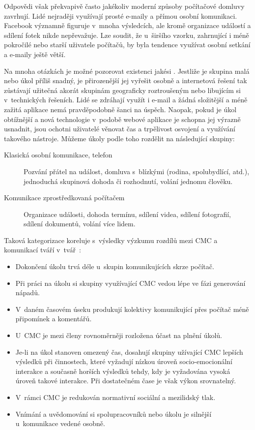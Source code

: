 \documentclass[12pt,oneside,final]{fithesis2}
\begin{document}
Odpovědi však překvapivě často jakékoliv moderní způsoby počítačové domluvy zavrhují. Lidé nejraději využívají prosté e-maily a přímou osobní komunikaci. Facebook významně figuruje v~mnoha výsledcích, ale kromě organizace událostí a sdílení fotek nikde nepřevažuje. Lze soudit, že u~širšího vzorku, zahrnující i méně pokročilé nebo starší uživatele počítačů, by byla tendence využívat osobní setkání a e-maily ještě větší.

Na mnoha otázkách je možné pozorovat existenci jakési . Jestliže je skupina malá nebo úkol příliš snadný, je přirozenější jej vyřešit osobně a internetová řešení tak zůstávají užitečná akorát skupinám geograficky roztroušeným nebo libujícím si v~technických řešeních. Lidé se zdráhají využít i e-mail a žádná složitější a méně zažitá aplikace nemá pravděpodobně šanci na úspěch. Naopak, pokud je úkol obtížnější a nová technologie v~podobě webové aplikace je schopna jej výrazně usnadnit, jsou ochotni uživatelé věnovat čas a trpělivost osvojení a využívání takového nástroje. Můžeme úkoly podle toho rozdělit na následující skupiny:

\begin{description}
    \item[Klasická osobní komunikace, telefon] Pozvání přátel na udá\-lost, do\-mlu\-va s~blíz\-ký\-mi (rodina, spolubydlící, atd.), jednoduchá skupinová dohoda či rozhodnutí, volání jednomu člověku.
    \item[Komunikace zprostředkovaná počítačem] Organizace události, dohoda termínu, sdílení videa, sdílení fotografií, sdílení dokumentů, volání více lidem.
\end{description}

Taková kategorizace koreluje s~výsledky výzkumu rozdílů mezi CMC a komunikací tváří v~tvář~\cite{bordia1997face}:

\begin{itemize}
    \item Dokončení úkolu trvá déle u~skupin komunikujících skrze počítač.
    \item Při práci na úkolu si skupiny využívající CMC vedou lépe ve fázi generování nápadů.
    \item V~daném časovém úseku produkují kolektivy komunikující přes po\-čí\-tač mé\-ně při\-po\-mí\-nek a ko\-men\-tá\-řů.
    \item U~CMC je mezi členy rovnoměrněji rozložena účast na plnění úkolů.
    \item Je-li na úkol stanoven omezený čas, dosahují skupiny užívající CMC lepších výsledků při činnostech, které vyžadují nízkou úroveň socio-emocionální interakce a současně horších výsledků tehdy, kdy je vyžadována vysoká úroveň takové interakce. Při dostatečném čase je však výkon srovnatelný.
    \item V~rámci CMC je redukován normativní sociální a mezilidský tlak.
    \item Vnímání a uvědomování si spolupracovníků nebo úkolu je silnější u~komunikace vedené osobně.
\end{itemize}
\end{document}
